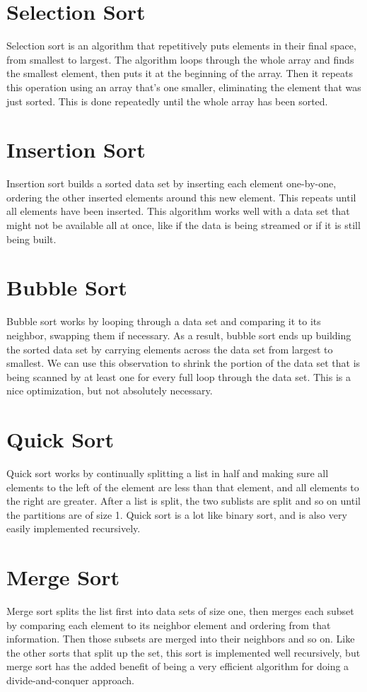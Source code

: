 \documentclass{article}
\begin{document}
\section{Selection Sort}
Selection sort is an algorithm that repetitively puts elements in their final
space, from smallest to largest. The algorithm loops through the whole array
and finds the smallest element, then puts it at the beginning of the array.
Then it repeats this operation using an array that's one smaller, eliminating
the element that was just sorted. This is done repeatedly until the whole array
has been sorted.

\section{Insertion Sort}
Insertion sort builds a sorted data set by inserting each element one-by-one,
ordering the other inserted elements around this new element. This repeats
until all elements have been inserted. This algorithm works well with a data
set that might not be available all at once, like if the data is being streamed
or if it is still being built.

\section{Bubble Sort}
Bubble sort works by looping through a data set and comparing it to its
neighbor, swapping them if necessary. As a result, bubble sort ends up building
the sorted data set by carrying elements across the data set from largest to
smallest. We can use this observation to shrink the portion of the data set
that is being scanned by at least one for every full loop through the data set.
This is a nice optimization, but not absolutely necessary.

\section{Quick Sort}
Quick sort works by continually splitting a list in half and making sure all
elements to the left of the element are less than that element, and all
elements to the right are greater. After a list is split, the two sublists are
split and so on until the partitions are of size 1. Quick sort is a lot like
binary sort, and is also very easily implemented recursively.

\section{Merge Sort}
Merge sort splits the list first into data sets of size one, then merges each
subset by comparing each element to its neighbor element and ordering from that
information. Then those subsets are merged into their neighbors and so on. Like
the other sorts that split up the set, this sort is implemented well
recursively, but merge sort has the added benefit of being a very efficient
algorithm for doing a divide-and-conquer approach.
\end{document}
